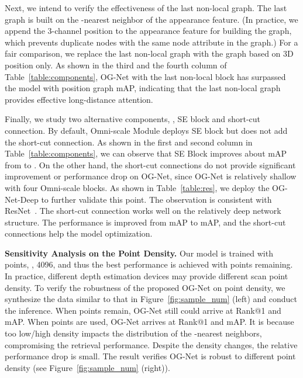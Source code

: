 Next, we intend to verify the effectiveness of the last non-local graph. The last graph is built on the -nearest neighbor of the appearance feature. (In practice, we append the 3-channel position to the appearance feature for building the graph, which prevents duplicate nodes with the same node attribute in the graph.) For a fair comparison, we replace the last non-local graph with the graph based on 3D position only. As shown in the third and the fourth column of Table~\ref{table:components}, OG-Net with the last non-local block has surpassed the model with position graph  mAP, indicating that the last non-local graph provides effective long-distance attention.  

Finally, we study two alternative components, \ie, SE block and short-cut connection. By default, Omni-scale Module deploys SE block but does not add the short-cut connection. As shown in the first and second column in Table~\ref{table:components}, we can observe that SE Block improves about  mAP from  to .
On the other hand, the short-cut connections do not provide significant improvement or performance drop on OG-Net, since OG-Net is relatively shallow with four Omni-scale blocks. As shown in Table~\ref{table:res}, we deploy the OG-Net-Deep to further validate this point. The observation is consistent with ResNet~\cite{he2016deep}. The short-cut connection works well on the relatively deep network structure. The performance is improved from  mAP to  mAP, and the short-cut connections help the model optimization. 

\textbf{Sensitivity Analysis on the Point Density.} Our model is trained with  points, \ie, 4096, and thus the best performance is achieved with  points remaining. In practice, different depth estimation devices may provide different scan point density. To verify the robustness of the proposed OG-Net on point density, we synthesize the data similar to that in Figure~\ref{fig:sample_num} (left) and conduct the inference. When  points remain, OG-Net still could arrive at  Rank@1 and  mAP. When  points are used, OG-Net arrives at  Rank@1 and  mAP. It is because too low/high density impacts the distribution of the -nearest neighbors, compromising the retrieval performance. Despite the density changes, the relative  performance drop is small. The result verifies OG-Net is robust to different point density (see Figure~\ref{fig:sample_num} (right)). 

